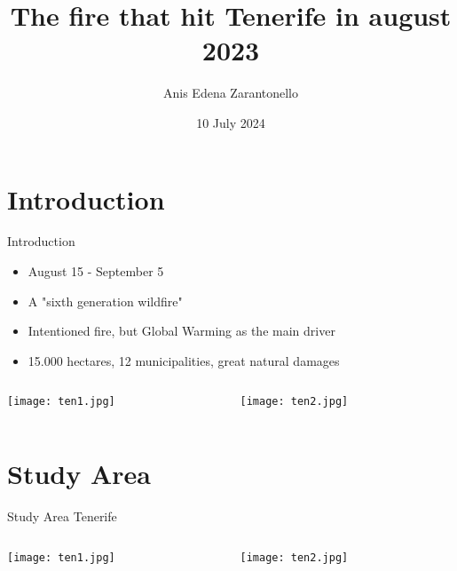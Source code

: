 \documentclass{beamer}
\title{The fire that hit Tenerife in august 2023}
\author{Anis Edena Zarantonello}
\date{10 July 2024}
\begin{document}
\maketitle %



\section{Introduction} %
\begin{frame}{Introduction} %
\begin{itemize} %
    \item August 15 - September 5
    \item A "sixth generation wildfire"
    \item Intentioned fire, but Global Warming as the main driver
    \item 15.000 hectares, 12 municipalities, great natural damages
\end{itemize}
\begin{columns}
\begin{column}{0.5\textwidth}
\begin{center}
    \texttt{[image: ten1.jpg]}
\end{center}
\end{column}
\begin{column}{0.5\textwidth}  
    \begin{center}
     \texttt{[image: ten2.jpg]}
     \end{center}
\end{column}
\end{columns}
\end{frame} 

\section{Study Area} 
\begin{frame}{Study Area}
Tenerife \begin{columns}
\begin{column}{0.5\textwidth}
\begin{center}
    \texttt{[image: ten1.jpg]}
\end{center}
\end{column}
\begin{column}{0.5\textwidth}  
    \begin{center}
     \texttt{[image: ten2.jpg]}
     \end{center}
\end{column}
\end{columns}
\end{frame} 
\end{document}
